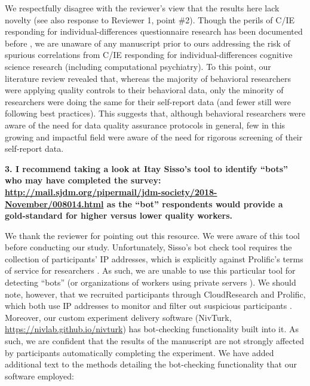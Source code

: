 \documentclass[a4paper,notitlepage,12pt]{article}
\begin{document}
We respectfully disagree with the reviewer's view that the results here lack novelty (see also response to Reviewer 1, point \#2). Though the perils of C/IE responding for individual-differences questionnaire research has been documented before \cite{chandler2020participant, arias2020little}, we are unaware of any manuscript prior to ours addressing the risk of spurious correlations from C/IE responding for individual-differences cognitive science research (including computational psychiatry). To this point, our literature review revealed that, whereas the majority of behavioral researchers were applying quality controls to their behavioral data, only the minority of researchers were doing the same for their self-report data (and fewer still were following best practices). This suggests that, although behavioral researchers were aware of the need for data quality assurance protocols in general, few in this growing and impactful field were aware of the need for rigorous screening of their self-report data.

\textbf{3. I recommend taking a look at Itay Sisso's tool to identify ``bots'' who may have completed the survey: \url{http://mail.sjdm.org/pipermail/jdm-society/2018-November/008014.html} as the ``bot'' respondents would provide a gold-standard for higher versus lower quality workers.}

We thank the reviewer for pointing out this resource. We were aware of this tool before conducting our study. Unfortunately, Sisso's bot check tool requires the collection of participants' IP addresses, which is explicitly against Prolific's terms of service for researchers \cite{prolific_ip_address}. As such, we are unable to use this particular tool for detecting ``bots'' (or organizations of workers using private servers \cite{dennis2020online}). We should note, however, that we recruited participants through CloudResearch and Prolific, which both use IP addresses to monitor and filter out suspicious participants \cite{cloudresearch_ip_address, prolific_ip_address_2}. Moreover, our custom experiment delivery software (NivTurk, \url{https://nivlab.github.io/nivturk}) has bot-checking functionality built into it. As such, we are confident that the results of the manuscript are not strongly affected by participants automatically completing the experiment. We have added additional text to the methods detailing the bot-checking functionality that our software employed:
\end{document}
